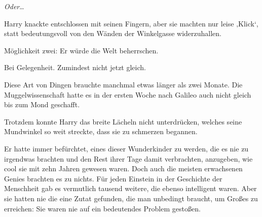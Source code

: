 \emph{Oder}…

Harry knackte entschlossen mit seinen Fingern, aber sie machten nur leise ‚Klick‘, statt bedeutungsvoll von den Wänden der Winkelgasse widerzuhallen.

Möglichkeit zwei: Er würde die Welt beherrschen.

Bei Gelegenheit. Zumindest nicht jetzt gleich.

Diese Art von Dingen brauchte manchmal etwas länger als zwei Monate. Die Muggelwissenschaft hatte es in der ersten Woche nach Galileo auch nicht gleich bis zum Mond geschafft.

Trotzdem konnte Harry das breite Lächeln nicht unterdrücken, welches seine Mundwinkel so weit streckte, dass sie zu schmerzen begannen.

Er hatte immer befürchtet, eines dieser Wunderkinder zu werden, die es nie zu irgendwas brachten und den Rest ihrer Tage damit verbrachten, anzugeben, wie cool sie mit zehn Jahren gewesen waren. Doch auch die meisten erwachsenen Genies brachten es zu nichts. Für jeden Einstein in der Geschichte der Menschheit gab es vermutlich tausend weitere, die ebenso intelligent waren. Aber sie hatten nie die eine Zutat gefunden, die man unbedingt braucht, um Großes zu erreichen: Sie waren nie auf ein bedeutendes Problem gestoßen.


